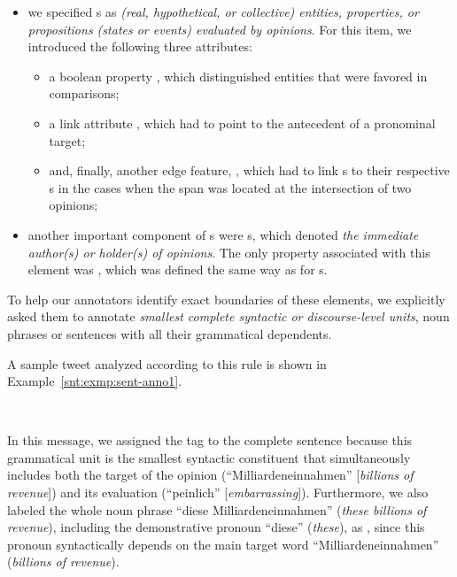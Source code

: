 \begin{itemize}
\item
  we specified \textbf{}s as \emph{(real,
    hypothetical, or collective) entities, properties, or propositions
    (states or events) evaluated by opinions}.  For this item, we
  introduced the following three attributes:
  \begin{itemize}
    \item
      a boolean property , which distinguished
      entities that were favored in comparisons;
    \item
      a link attribute , which had to point to the
      antecedent of a pronominal target;
    \item and, finally, another edge feature,
      , which had to link s
      to their respective s in the cases when the
       span was located at the intersection of two
      opinions;
  \end{itemize}

\item
  another important component of s were
  \textbf{}s, which denoted \emph{the immediate
    author(s) or holder(s) of opinions}.  The only property associated
  with this element was , which was defined
  the same way as for s.
\end{itemize}
To help our annotators identify exact boundaries of these elements, we
explicitly asked them to annotate \emph{smallest complete syntactic or
  discourse-level units}, \ie{} noun phrases or sentences with all
their grammatical dependents.

A sample tweet analyzed according to this rule is shown in
Example~\ref{snt:exmp:sent-anno1}.
\begin{example}\label{snt:exmp:sent-anno1}
  \upshape{}\\[0.8em]
  \noindent{}
\end{example}
In this message, we assigned the  tag to the
complete sentence because this grammatical unit is the smallest
syntactic constituent that simultaneously includes both the target of
the opinion (``Milliardeneinnahmen'' [\emph{billions of revenue}]) and
its evaluation (``peinlich'' [\emph{embarrassing}]).  Furthermore, we
also labeled the whole noun phrase ``diese Milliardeneinnahmen''
(\emph{these billions of revenue}), including the demonstrative
pronoun ``diese'' (\emph{these}), as , since this
pronoun syntactically depends on the main target word
``Milliardeneinnahmen'' (\emph{billions of revenue}).

